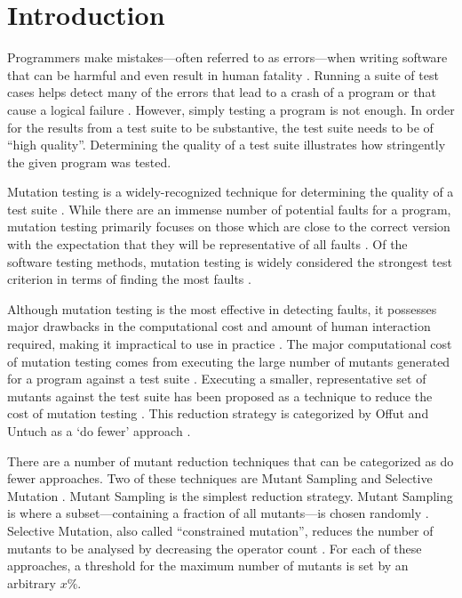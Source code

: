 \section{Introduction}
Programmers make mistakes---often referred to as errors---when writing software
that can be harmful and even result in human fatality \cite{vicente2003programming}.
Running a suite of test cases helps detect many of the errors
that lead to a crash of a program or that cause a logical failure \cite{wagner2005comparing}.
However, simply testing a program is not enough. In order for the results
from a test suite to be substantive, the test suite needs to be of ``high quality''.
Determining the quality of a test suite illustrates how stringently the given
program was tested.

Mutation testing is a widely-recognized technique for determining the quality
of a test suite \cite{gopinath2015mutation}. While there are an immense number
of potential faults for a program, mutation testing primarily focuses on those
which are close to the correct version with the expectation that they will
be representative of all faults \cite{jia2011analysis}.
Of the software testing methods, mutation testing is widely considered the strongest
test criterion in terms of finding the most faults \cite{ammann2008introduction}.

Although mutation testing is the most effective in detecting faults, it possesses
major drawbacks in the computational cost and amount of human interaction required, making it
impractical to use in practice \cite{gopinath2015mutation, wong1995reducing, gopinath2015empirical}.
The major computational cost of mutation testing comes from executing the large number of mutants generated for a
program against a test suite \cite{offutt1993experimental}. Executing a smaller, representative
set of mutants against the test suite has been proposed as a technique to reduce
the cost of mutation testing \cite{jia2011analysis, wong1995reducing, offutt1993experimental, offutt2001mutation}.
This reduction strategy is categorized by Offut and Untuch as a `do fewer' approach \cite{offutt2001mutation}.

There are a number of mutant reduction techniques that can be categorized as do fewer approaches. Two of these techniques are Mutant Sampling and Selective Mutation \cite{jia2011analysis, wong1995reducing, offutt1993experimental}.
Mutant Sampling is the simplest reduction strategy. Mutant Sampling is where a subset---containing a fraction of all mutants---is
chosen randomly \cite{wong1995reducing}. Selective Mutation, also called ``constrained mutation'',
reduces the number of mutants to be analysed by decreasing the operator count \cite{jia2011analysis, offutt1993experimental, mathur1991performance}.
For each of these approaches, a threshold for the maximum number of mutants is set by an arbitrary \(x\%\).

